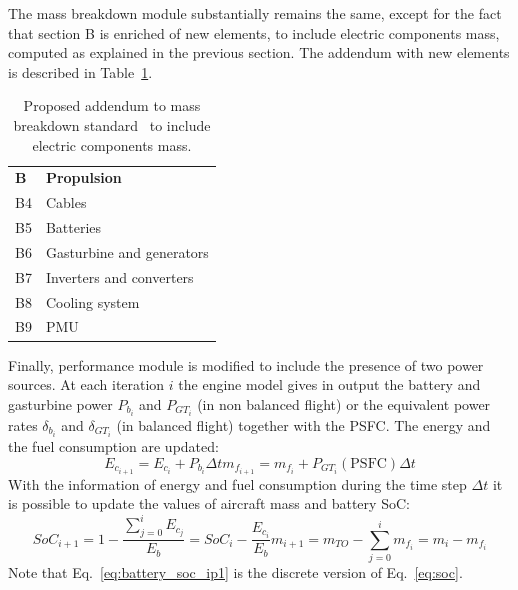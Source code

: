The mass breakdown module substantially remains the same, except for the fact that section B is enriched of new elements, to include electric components mass, computed as explained in the previous section. 
The addendum with new elements is described in Table~\ref{tab:hybrid_addendum_mass_breakdown}. 
\begin{table}[!h]
	\centering
	\begin{tabular}{l l}
		\hline
		\textbf{B} & \textbf{Propulsion} \\
		B4 & Cables \\
		B5 & Batteries \\
		B6 & Gasturbine and generators \\
		B7 & Inverters and converters \\
		B8 & Cooling system \\
		B9 & PMU \\		
		\hline
	\end{tabular}
	\caption{Proposed addendum to mass breakdown standard~\cite{bib:mass_breakdown} to include electric components mass.}
	\label{tab:hybrid_addendum_mass_breakdown}
\end{table} 

Finally, performance module is modified to include the presence of two power sources. 
At each iteration $i$ the engine model gives in output the battery and gasturbine power $P_{b_{i}}$ and $P_{GT_{i}}$ (in non balanced flight) or the equivalent power rates $\delta_{b_{i}}$ and $\delta_{GT_{i}}$ (in balanced flight) together with the PSFC.
The energy and the fuel consumption are updated:
\begin{subequations}
	\label{eq:energy_fuel_hybrid_ip1}
	\begin{equation}
		\label{eq:energy_ip1}
		E_{c_{i+1}} = E_{c_{i}} + P_{b_{i}}\Delta t
	\end{equation}
	\begin{equation}
		\label{eq:fuel_hybrid_ip1}
		m_{f_{i+1}} = m_{f_{i}} + P_{GT_{i}}\left(\textrm{PSFC}\right)\Delta t
	\end{equation}	
\end{subequations} 
With the information of energy and fuel consumption during the time step $\Delta t$ it is possible to update the values of aircraft mass and battery SoC:
\begin{subequations}
	\label{eq:state_vector_hybrid_ip1}
	\begin{equation}
		\label{eq:battery_soc_ip1}
		SoC_{i+1} = 1 - \frac{\sum_{j=0}^{i}E_{c_{j}}}{E_b} = SoC_{i} - \frac{E_{c_i}}{E_b} 
	\end{equation}
	\begin{equation}
		\label{eq:ac_mass_ip1}
		m_{i+1} = m_{TO} - \sum_{j=0}^{i}m_{f_{i}} = m_{i} - m_{f_{i}}
	\end{equation}
\end{subequations}
Note that Eq.~\eqref{eq:battery_soc_ip1} is the discrete version of Eq.~\eqref{eq:soc}. 

